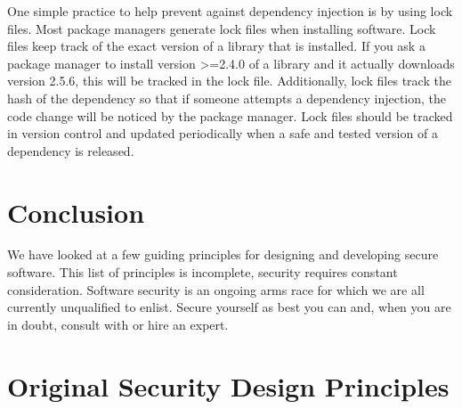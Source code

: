 One simple practice to help prevent against dependency injection is by using lock files.
Most package managers generate lock files when installing software.
Lock files keep track of the exact version of a library that is installed.
If you ask a package manager to install version >=2.4.0 of a library and it actually downloads version 2.5.6,
this will be tracked in the lock file.
Additionally, lock files track the hash of the dependency so that if someone attempts a dependency injection,
the code change will be noticed by the package manager.
Lock files should be tracked in version control and updated periodically when a safe and tested version of a dependency is released.

\section{Conclusion}
We have looked at a few guiding principles for designing and developing secure software.
This list of principles is incomplete, security requires constant consideration.
Software security is an ongoing arms race for which we are all currently unqualified to enlist.
Secure yourself as best you can and, when you are in doubt,
consult with or hire an expert.

\appendix
\section{Original Security Design Principles}\label{all-principles}


